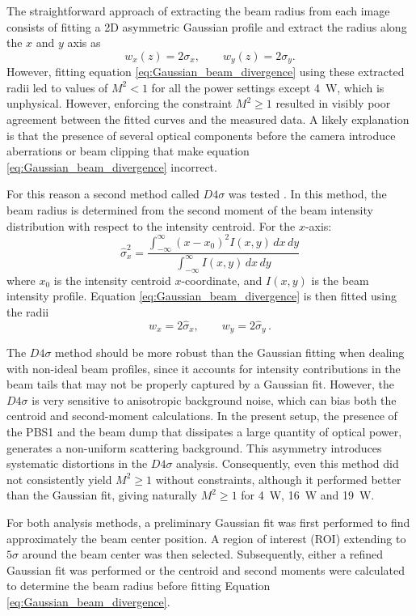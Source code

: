 The straightforward approach of extracting the beam radius from each image consists of fitting a 2D asymmetric Gaussian profile and extract the radius along the $x$ and $y$ axis as
\begin{equation}
    w_x(z)=2\sigma_x, \qquad w_y(z)=2\sigma_y.
\end{equation}
However, fitting equation \eqref{eq:Gaussian_beam_divergence} using these extracted radii led to values of $M^2<1$ for all the power settings except 4~W, which is unphysical. However, enforcing the constraint $M^2\ge1$ resulted in visibly poor agreement between the fitted curves and the measured data.
A likely explanation is that the presence of several optical components before the camera introduce aberrations or beam clipping that make equation \eqref{eq:Gaussian_beam_divergence} incorrect.

For this reason a second method called $D4\sigma$ was tested \cite{Siegman98}. In this method, the beam radius is determined from the second moment of the beam intensity distribution with respect to the intensity centroid. For the $x$-axis:
\begin{equation}
    \hat{\sigma}_x^2 = \frac{\int_{-\infty}^{\infty} (x - x_0)^2 I(x, y) \, dx \, dy}{\int_{-\infty}^{\infty} I(x, y) \, dx \, dy}
\end{equation}
where $x_0$ is the intensity centroid $x$-coordinate, and $I(x,y)$ is the beam intensity profile.
Equation \eqref{eq:Gaussian_beam_divergence} is then fitted using the radii
\begin{equation}
    w_x = 2\hat{\sigma}_x, \qquad  w_y = 2\hat{\sigma}_y\,.
\end{equation}

The $D4\sigma$ method should be more robust than the Gaussian fitting when dealing with non-ideal beam profiles, since it accounts for intensity contributions in the beam tails that may not be properly captured by a Gaussian fit. However, the $D4\sigma$ is very sensitive to anisotropic background noise, which can bias both the centroid and second-moment calculations.
In the present setup, the presence of the PBS1 and the beam dump that dissipates a large quantity of optical power, generates a non-uniform scattering background. This asymmetry introduces systematic distortions in the $D4\sigma$ analysis.
Consequently, even this method did not consistently yield $M^2\ge1$ without constraints, although it performed better than the Gaussian fit, giving naturally $M^2\ge1$ for 4~W, 16~W and 19~W.

For both analysis methods, a preliminary Gaussian fit was first performed to find approximately the beam center position. A region of interest (ROI) extending to $5\sigma$ around the beam center was then selected. Subsequently, either a refined Gaussian fit was performed or the centroid and second moments were calculated to determine the beam radius before fitting Equation \eqref{eq:Gaussian_beam_divergence}.

